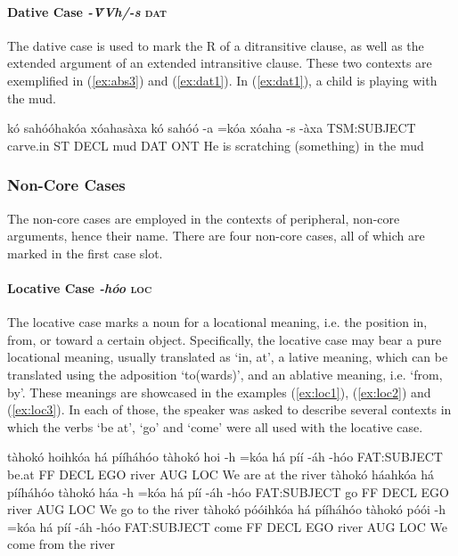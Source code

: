 \documentclass[a4paper, 12pt, oneside]{memoir}
\newcommand{\emh}[1]{\textit{#1}}
\begin{document}
\paragraph{Dative Case \emh{-V̀Vh/-s} \textsc{dat}}
The dative case is used to mark the R of a ditransitive clause, as well as the extended argument of an extended intransitive clause. These two contexts are exemplified in (\ref{ex:abs3}) and (\ref{ex:dat1}). In (\ref{ex:dat1}), a child is playing with the mud.
\begin{examples}
\ex \label{ex:dat1}
\words kó sahóóhakóa xóahasàxa
\bits kó sahóó -a =kóa xóaha -s -àxa
\gloss TSM:SUBJECT carve.in ST DECL mud DAT ONT
\tr He is scratching (something) in the mud
\end{examples}
\subsubsection{Non-Core Cases}\label{sncorecase}
The non-core cases are employed in the contexts of peripheral, non-core arguments, hence their name. There are four non-core cases, all of which are marked in the first case slot.
\paragraph{Locative Case \emh{-hóo} \textsc{loc}}
The locative case marks a noun for a locational meaning, i.e. the position in, from, or toward a certain object. Specifically, the locative case may bear a pure locational meaning, usually translated as `in, at', a lative meaning, which can be translated using the adposition `to(wards)', and an ablative meaning, i.e. `from, by'. These meanings are showcased in the examples (\ref{ex:loc1}), (\ref{ex:loc2}) and (\ref{ex:loc3}). In each of those, the speaker was asked to describe several contexts in which the verbs `be at', `go' and `come' were all used with the locative case. 
\begin{examples}
\ex \label{ex:loc1}
\words tàhokó hoihkóa há pííháhóo
\bits tàhokó hoi -h =kóa há píí -áh -hóo
\gloss FAT:SUBJECT be.at FF DECL EGO river AUG LOC
\tr We are at the river
\ex \label{ex:loc2}
\words tàhokó háahkóa há pííháhóo
\bits tàhokó háa -h =kóa há píí -áh -hóo
\gloss FAT:SUBJECT go FF DECL EGO river AUG LOC
\tr We go to the river
\ex \label{ex:loc3}
\words tàhokó póóihkóa há pííháhóo
\bits tàhokó póói -h =kóa há píí -áh -hóo
\gloss FAT:SUBJECT come FF DECL EGO river AUG LOC
\tr We come from the river
\end{examples}
\end{document}
